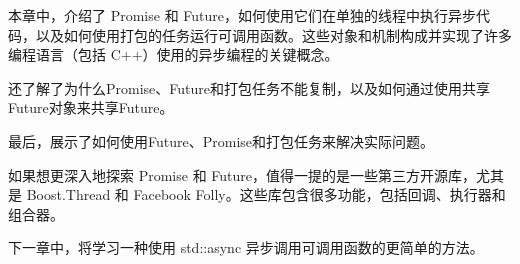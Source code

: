 本章中，介绍了 Promise 和 Future，如何使用它们在单独的线程中执行异步代码，以及如何使用打包的任务运行可调用函数。这些对象和机制构成并实现了许多编程语言（包括 C++）使用的异步编程的关键概念。

还了解了为什么Promise、Future和打包任务不能复制，以及如何通过使用共享Future对象来共享Future。

最后，展示了如何使用Future、Promise和打包任务来解决实际问题。

如果想更深入地探索 Promise 和 Future，值得一提的是一些第三方开源库，尤其是 Boost.Thread 和 Facebook Folly。这些库包含很多功能，包括回调、执行器和组合器。

下一章中，将学习一种使用 std::async 异步调用可调用函数的更简单的方法。


